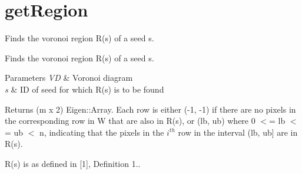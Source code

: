 \hypertarget{group__getRegion}{}\section{get\+Region}
\label{group__getRegion}


Finds the voronoi region R(s) of a seed s.  


Finds the voronoi region R(s) of a seed s. 


\begin{DoxyParams}{Parameters}
{\em VD} & Voronoi diagram \\
\hline
{\em s} & ID of seed for which R(s) is to be found \\
\hline
\end{DoxyParams}
\begin{DoxyReturn}{Returns}
(m x 2) Eigen\+::\+Array. Each row is either (-\/1, -\/1) if there are no pixels in the corresponding row in W that are also in R(s), or (lb, ub) where 0 $<$= lb $<$= ub $<$ n, indicating that the pixels in the $i^{th}$ row in the interval (lb, ub\mbox{]} are in R(s).
\end{DoxyReturn}
R(s) is as defined in \mbox{[}1\mbox{]}, Definition 1.. 